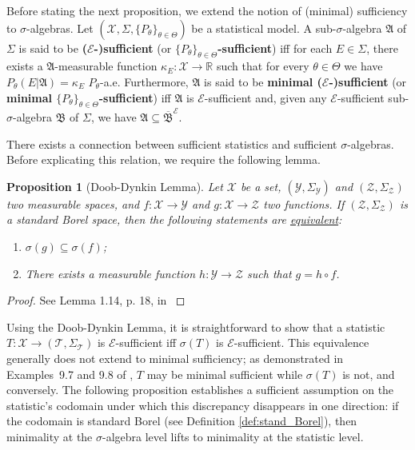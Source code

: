 \documentclass[12pt]{article}
\newtheorem{proposition}{Proposition}[section]
\begin{document}
Before stating the next proposition, we  extend the notion of (minimal) sufficiency to $\sigma$-algebras. Let $(\mathcal{X},\Sigma ,\{P_\theta \}_{\theta\in\Theta })$ be a statistical model. A sub-$\sigma$-algebra $\mathfrak{A}$ of $\Sigma$ is said to be {\bf($\mathcal{E}$-)sufficient} (or {\bf$\{P_\theta\}_{\theta\in\Theta}$-sufficient}) iff for each $E\in\Sigma$, there exists a $\mathfrak{A}$-measurable function $\kappa _E:\mathcal{X}\to \mathbb{R}$ such that for every $\theta\in\Theta$ we have $P\!_\theta (E|\mathfrak{A})=\kappa _E$ $P_\theta$-a.e. Furthermore, $\mathfrak{A}$ is said to be {\bf minimal ($\mathcal{E}$-)sufficient} (or {\bf minimal $\{P_\theta\}_{\theta\in\Theta}$-sufficient}) iff $\mathfrak{A}$ is $\mathcal{E}$-sufficient and, given any $\mathcal{E}$-sufficient sub-$\sigma$-algebra $\mathfrak{B}$ of $\Sigma$, we have $\mathfrak{A}\subseteq \overline{\mathfrak{B}}^\mathcal{E}$.

There exists a connection between sufficient statistics and sufficient $\sigma$-algebras. Before explicating this relation, we require the following lemma.

\begin{proposition}[Doob-Dynkin Lemma]
\label{doob_lemma}
Let $\mathcal{X}$ be a set, $(\mathcal{Y},\Sigma _\mathcal{Y})$ and $(\mathcal{Z},\Sigma _\mathcal{Z})$ two measurable spaces, and $f:\mathcal{X}\to \mathcal{Y}$ and $g:\mathcal{X}\to \mathcal{Z}$ two functions. If $(\mathcal{Z},\Sigma _\mathcal{Z})$ is a standard Borel space, then the following statements are \underline{equivalent}:
    \begin{enumerate}
        \item $\sigma (g)\subseteq \sigma (f)$;
        \item There exists a measurable function $h:\mathcal{Y}\to \mathcal{Z}$ such that $g=h\circ f$.
    \end{enumerate}
\end{proposition}

\begin{proof}
See Lemma 1.14, p. 18, in \cite{Kallenberg2021}
\end{proof}

Using the Doob-Dynkin Lemma, it is straightforward to show that a statistic $T:\mathcal{X}\to (\mathcal{T},\Sigma _\mathcal{T})$ is $\mathcal{E}$-sufficient iff $\sigma (T)$ is $\mathcal{E}$-sufficient. This equivalence generally does not extend to minimal sufficiency; as demonstrated in Examples~9.7 and 9.8 of \cite{Heyer1982}, $T$ may be minimal sufficient while $\sigma (T)$ is not, and conversely. The following proposition establishes a sufficient assumption on the statistic's codomain under which this discrepancy disappears in one direction: if the codomain is standard Borel (see Definition \ref{def:stand_Borel}), then minimality at the $\sigma$-algebra level lifts to minimality at the statistic level.
\end{document}
